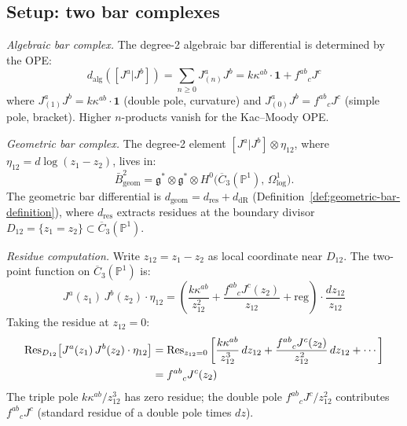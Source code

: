 \subsection{Setup: two bar complexes}

\begin{computation}
\label{comp:geom-alg-comparison-deg2}

\emph{Algebraic bar complex.}
The degree-2 algebraic bar differential is determined by the OPE:
\begin{equation}\label{eq:alg-bar-def}
d_{\mathrm{alg}}([J^a|J^b])
= \sum_{n \geq 0} J^a_{(n)} J^b
= k\kappa^{ab}\cdot\mathbf{1} + {f^{ab}}_c J^c
\end{equation}
where $J^a_{(1)} J^b = k\kappa^{ab}\cdot\mathbf{1}$ (double pole,
curvature) and $J^a_{(0)} J^b = {f^{ab}}_c J^c$ (simple pole,
bracket).  Higher $n$-products vanish for the Kac--Moody OPE.

\emph{Geometric bar complex.}
The degree-2 element $[J^a|J^b] \otimes \eta_{12}$, where
$\eta_{12} = d\log(z_1 - z_2)$, lives in:
\[
\bar{B}^2_{\mathrm{geom}} = \mathfrak{g}^* \otimes \mathfrak{g}^*
\otimes H^0\bigl(\overline{C}_3(\mathbb{P}^1),\,
\Omega^1_{\log}\bigr).
\]
The geometric bar differential is
$d_{\mathrm{geom}} = d_{\mathrm{res}} + d_{\mathrm{dR}}$
(Definition~\ref{def:geometric-bar-definition}), where $d_{\mathrm{res}}$
extracts residues at the boundary divisor $D_{12} = \{z_1 = z_2\}
\subset \overline{C}_3(\mathbb{P}^1)$.

\emph{Residue computation.}
Write $z_{12} = z_1 - z_2$ as local coordinate near $D_{12}$.
The two-point function on $\overline{C}_3(\mathbb{P}^1)$ is:
\begin{equation}
J^a(z_1)\, J^b(z_2) \cdot \eta_{12}
= \left(\frac{k\kappa^{ab}}{z_{12}^2}
+ \frac{{f^{ab}}_c J^c(z_2)}{z_{12}} + \text{reg}\right)
\cdot \frac{dz_{12}}{z_{12}}
\end{equation}
Taking the residue at $z_{12} = 0$:
\begin{align}
\operatorname{Res}_{D_{12}}
\bigl[J^a(z_1)\, J^b(z_2) \cdot \eta_{12}\bigr]
&= \operatorname{Res}_{z_{12} = 0}
\left[\frac{k\kappa^{ab}}{z_{12}^3}\,dz_{12}
+ \frac{{f^{ab}}_c J^c(z_2)}{z_{12}^2}\,dz_{12}
+ \cdots\right] \notag \\
&= {f^{ab}}_c J^c(z_2) \label{eq:geom-residue-simple}
\end{align}
The triple pole $k\kappa^{ab}/z_{12}^3$ has zero residue; the
double pole ${f^{ab}}_c J^c/z_{12}^2$ contributes
${f^{ab}}_c J^c$ (standard residue of a double pole times $dz$).


\end{computation}
